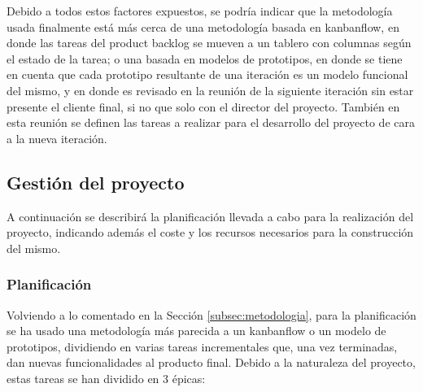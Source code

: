 Debido a todos estos factores expuestos, se podría indicar que la metodología usada finalmente está más cerca de una metodología basada en kanbanflow, en donde las tareas del product backlog se mueven a un tablero con columnas según el estado de la tarea; o una basada en modelos de prototipos, en donde se tiene en cuenta que cada prototipo resultante de una iteración es un modelo funcional del mismo, y en donde es revisado en la reunión de la siguiente iteración sin estar presente el cliente final, si no que solo con el director del proyecto. También en esta reunión se definen las tareas a realizar para el desarrollo del proyecto de cara a la nueva iteración.

\subsection{Gestión del proyecto}
\label{subsec:gestion}

A continuación se describirá la planificación llevada a cabo para la realización del proyecto, indicando además el coste y los recursos necesarios para la construcción del mismo.

\subsubsection{Planificación}

Volviendo a lo comentado en la Sección \ref{subsec:metodologia}, para la planificación se ha usado una metodología más parecida a un kanbanflow o un modelo de prototipos, dividiendo en varias tareas incrementales que, una vez terminadas, dan nuevas funcionalidades al producto final. Debido a la naturaleza del proyecto, estas tareas se han dividido en 3 épicas:

